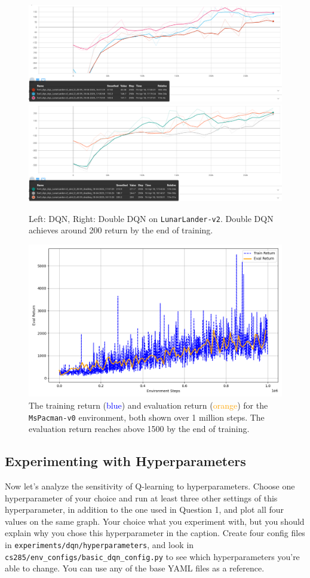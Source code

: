 \documentclass{article}
\begin{document}
\begin{figure}[H]
  \centering
  \includegraphics[width=0.49\linewidth]{imgs/hw3_dqn_LunarLander-v2.png}
  \includegraphics[width=0.49\linewidth]{imgs/hw3_double_dqn_LunarLander-v2.png}
  \caption{Left: DQN, Right: Double DQN on \texttt{LunarLander-v2}. Double DQN achieves around 200 return by the end of training.}
  \label{fig:lunarlander}
\end{figure}

\begin{figure}[H]
  \centering
  \includegraphics[width=0.8\linewidth]{imgs/hw3_double_dqn_MsPacman_Plotonce.png}
  \caption{The training return (\textcolor{blue}{blue}) and evaluation return (\textcolor{orange}{orange}) for the \texttt{MsPacman-v0} environment, both shown over 1 million steps. The evaluation return reaches above 1500 by the end of training.}
  \label{fig:double_dqn_mspacman}
\end{figure}

\subsection{Experimenting with Hyperparameters} Now let's analyze the sensitivity of Q-learning to hyperparameters. Choose one hyperparameter of your choice and run at least three other settings of this hyperparameter, in addition to the one used in Question 1, and plot all four values on the same graph. Your choice what you experiment with, but you should explain why you chose this hyperparameter in the caption. Create four config files in \verb|experiments/dqn/hyperparameters|, and look in \verb|cs285/env_configs/basic_dqn_config.py| to see which hyperparameters you're able to change. You can use any of the base YAML files as a reference.
\end{document}
